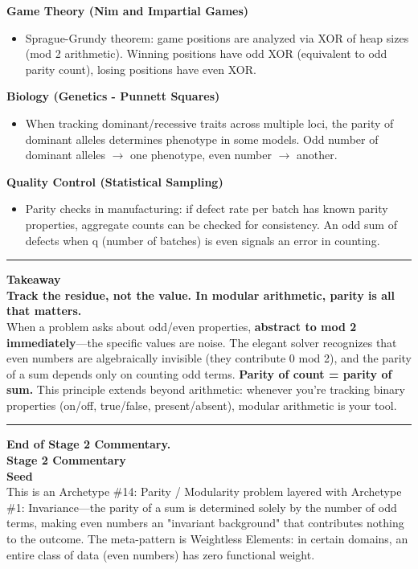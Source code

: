 \documentclass{article}
\begin{document}
\textbf{Game Theory (Nim and Impartial Games)}
\begin{itemize}
    \item Sprague-Grundy theorem: game positions are analyzed via XOR of heap sizes (mod 2 arithmetic). Winning positions have odd XOR (equivalent to odd parity count), losing positions have even XOR.
\end{itemize}
\textbf{Biology (Genetics - Punnett Squares)}
\begin{itemize}
    \item When tracking dominant/recessive traits across multiple loci, the parity of dominant alleles determines phenotype in some models. Odd number of dominant alleles $\to$ one phenotype, even number $\to$ another.
\end{itemize}
\textbf{Quality Control (Statistical Sampling)}
\begin{itemize}
    \item Parity checks in manufacturing: if defect rate per batch has known parity properties, aggregate counts can be checked for consistency. An odd sum of defects when q (number of batches) is even signals an error in counting.
\end{itemize}
\noindent \rule{\textwidth}{0.4pt}

\noindent \textbf{Takeaway} \\
\textbf{Track the residue, not the value. In modular arithmetic, parity is all that matters.} \\
When a problem asks about odd/even properties, \textbf{abstract to mod 2 immediately}—the specific values are noise. The elegant solver recognizes that even numbers are algebraically invisible (they contribute 0 mod 2), and the parity of a sum depends only on counting odd terms. \textbf{Parity of count = parity of sum.} This principle extends beyond arithmetic: whenever you're tracking binary properties (on/off, true/false, present/absent), modular arithmetic is your tool. \\
\noindent \rule{\textwidth}{0.4pt}
\noindent \textbf{End of Stage 2 Commentary.} \\

\noindent \textbf{Stage 2 Commentary} \\

\noindent \textbf{Seed} \\
This is an Archetype \#14: Parity / Modularity problem layered with Archetype \#1: Invariance—the parity of a sum is determined solely by the number of odd terms, making even numbers an "invariant background" that contributes nothing to the outcome. The meta-pattern is Weightless Elements: in certain domains, an entire class of data (even numbers) has zero functional weight. \\
\end{document}
